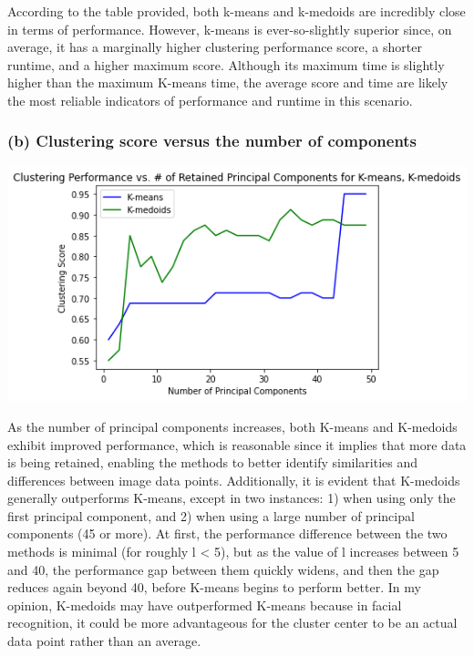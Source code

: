 \documentclass[11pt]{article}
\newcommand{\sol}[1]{{\bf{\color{magenta}{{Solution:}}}}}
\begin{document}
According to the table provided, both k-means and k-medoids are incredibly close in terms of performance. However, k-means is ever-so-slightly superior since, on average, it has a marginally higher clustering performance score, a shorter runtime, and a higher maximum score. Although its maximum time is slightly higher than the maximum K-means time, the average score and time are likely the most reliable indicators of performance and runtime in this scenario.

\subsubsection{(b) Clustering score versus the number of components}
\sol x

\begin{center}
    \includegraphics[scale=0.6]{3b.png}
\end{center}

As the number of principal components increases, both K-means and K-medoids exhibit improved performance, which is reasonable since it implies that more data is being retained, enabling the methods to better identify similarities and differences between image data points. Additionally, it is evident that K-medoids generally outperforms K-means, except in two instances: 1) when using only the first principal component, and 2) when using a large number of principal components (45 or more). At first, the performance difference between the two methods is minimal (for roughly l < 5), but as the value of l increases between 5 and 40, the performance gap between them quickly widens, and then the gap reduces again beyond 40, before K-means begins to perform better. In my opinion, K-medoids may have outperformed K-means because in facial recognition, it could be more advantageous for the cluster center to be an actual data point rather than an average.
\end{document}
